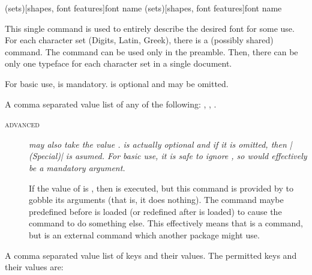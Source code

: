 \documentclass{ltxdockit}
\newenvironment{advanced}
            {\begin{minipage}[t]{\textwidth}\begin{description}\item[\rmfamily\mdseries\scshape\footnotesize\spotcolor advanced]\itshape\footnotesize}
            {\end{description}\end{minipage}}
\begin{document}
\begin{ltxsyntax}

(sets)[shapes, font features]{font name}
(sets)[shapes, font features]{font name}

This single command is used to entirely describe the desired font for some use. For each character set (Digits, Latin, Greek), there is a (possibly shared)  command. The command can be used only in the preamble. Then, there can be only one typeface for each character set in a single document.

For basic use,  is mandatory.  is optional and may be omitted.

\begin{marglist}

\item[\prm{sets}]
A comma separated value list of any of the following: , , .

\begin{advanced}
 may also take the value .  is actually optional and if it is omitted, then |(Special)| is asumed. For basic use, it is safe to ignore , so  would effectively be a mandatory argument.

If the value of  is , then {\spotcolor{}} is executed, but this command is provided by  to gobble its arguments (that is, it does nothing). The command {\spotcolor{}} maybe predefined before  is loaded (or redefined after  is loaded) to cause the command to do something else. This effectively means that
{\spotcolor{}}
is a  command, but
{\spotcolor{}}
is an external command which another package might use.
\end{advanced}

\item[\prm{shapes}]
A comma separated value list of keys and their values. The permitted keys and their values are:

\begin{optionlist}




\end{optionlist}
\end{marglist}
\end{ltxsyntax}
\end{document}
